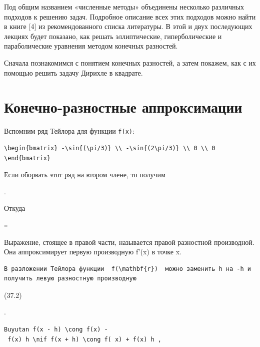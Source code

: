 \documentclass[
  ukrainian,
]{article}
\begin{document}
Под общим названием «численные методы» объединены несколько различных
подходов к решению задач. Подробное описание всех этих подходов можно
найти в книге {[}4{]} из рекомендованного списка литературы. В этой и
двух последующих лекциях будет показано, как решать эллиптические,
гиперболические и параболические уравнения методом конечных разностей.

Сначала познакомимся с понятием конечных разностей, а затем покажем, как
с их помощью решить задачу Дирихле в квадрате.

\section{Конечно-разностные
аппроксимации}\label{ux43aux43eux43dux435ux447ux43dux43e-ux440ux430ux437ux43dux43eux441ux442ux43dux44bux435-ux430ux43fux43fux440ux43eux43aux441ux438ux43cux430ux446ux438ux438}

Вспомним ряд Тейлора для функции \texttt{f(x)}:

\begin{verbatim}
\begin{bmatrix} -\sin{(\pi/3)} \\ -\sin{(2\pi/3)} \\ 0 \\ 0 \end{bmatrix}
\end{verbatim}

Если оборвать этот ряд на втором члене, то получим

.

Откуда

\begin{verbatim}
=
\end{verbatim}

Выражение, стоящее в правой части, называется правой разностной
производной. Она аппроксимирует первую производную f'(x) в точке x.

\begin{verbatim}
В разложении Тейлора функции  f(\mathbf{r})  можно заменить h на -h и получить левую разностную производную
\end{verbatim}

(37.2)

.

\texttt{Buyutan\ \textquotesingle{}f(x\ -\ h)\ \textbackslash{}cong\ f(x)\ -\ f\textquotesingle{}(x)\ h\textquotesingle{}\ \textbackslash{}nif\ \textquotesingle{}f(x\ +\ h)\ \textbackslash{}cong\ f(\ x)\ +\ f\textquotesingle{}(x)\ h\textquotesingle{}\ ,}
\end{document}
